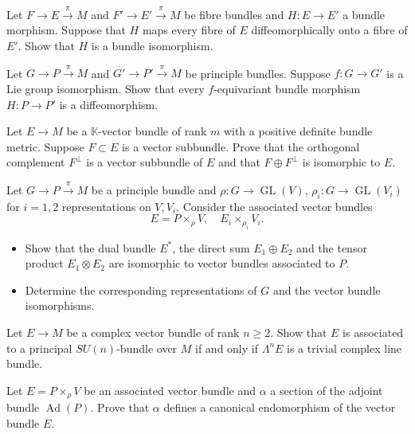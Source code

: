 \begin{exercise}
    Let $F\to E \stackrel{\pi}{\rightarrow} M$ and
    $F'\to E' \stackrel{\pi}{\rightarrow} M$ be fibre bundles
    and $H:E\to E'$ a bundle morphism. Suppose that $H$
    maps every fibre of $E$ diffeomorphically onto a fibre
    of $E'$. Show that $H$ is a bundle isomorphism.
\end{exercise}


\begin{exercise}
    Let $G\to P\stackrel{\pi}{\rightarrow} M$ and 
    $G'\to P' \stackrel{\pi}{\rightarrow} M$ be principle
    bundles. Suppose $f: G\to G'$ is a Lie group isomorphism.
    Show that every $f$-equivariant bundle morphism
    $H:P\to P'$ is a diffeomorphism.
\end{exercise}


\begin{exercise}
    Let $E\to M$ be a $\mathbb{K}$-vector bundle of rank $m$
    with a positive definite bundle metric. Suppose $F\subset E$
    is a vector subbundle. Prove that the orthogonal complement 
    $F^\perp$ is a vector subbundle of $E$ and that $F\oplus F^\perp$
    is isomorphic to $E$.
\end{exercise}


\begin{exercise}
    Let $G\to P\stackrel{\pi}{\rightarrow} M$ be a principle bundle
    and $\rho: G\to \operatorname{GL}(V)$,
    $\rho_i: G\to \operatorname{GL}(V_i)$ for $i=1,2$
    representations on $V,V_i$.
    Consider the associated vector bundles
    \begin{equation*}
        E=P\times_\rho V,\quad E_i\times_{\rho_i} V_i.
    \end{equation*}

    \begin{itemize}
        \item Show that the dual bundle $E^*$, the direct
        sum $E_1\oplus E_2$ and the tensor product $E_1\otimes E_2$
        are isomorphic to vector bundles associated to $P$.

        \item Determine the corresponding representations of $G$
        and the vector bundle isomorphisms.
    \end{itemize}
\end{exercise}

\begin{exercise}
    Let $E\to M$ be a complex vector bundle of rank $n\ge 2$.
    Show that $E$ is associated to a principal $SU(n)$-bundle
    over $M$ if and only if $\Lambda^n E$ is a trivial complex
    line bundle.
\end{exercise}


\begin{exercise}
    Let $E=P\times_\rho V$ be an associated vector bundle
    and $\alpha$ a section of the adjoint bundle $\operatorname{Ad}(P)$.
    Prove that $\alpha$ defines a canonical endomorphism of the vector bundle $E$.
\end{exercise}